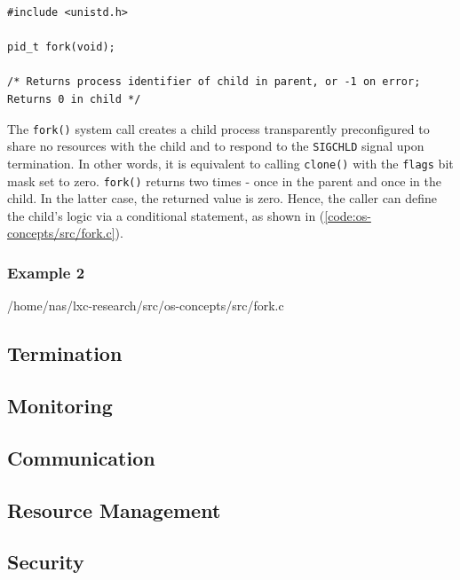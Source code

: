 \begin{lstlisting}[style=syscalls, caption={Fork System Call Wrapper}]
#include <unistd.h>

pid_t fork(void);

/* Returns process identifier of child in parent, or -1 on error; Returns 0 in child */
\end{lstlisting}
The \verb|fork()| system call creates a child process transparently preconfigured to share 
no resources with the child and to respond to the \verb|SIGCHLD| signal upon termination.
In other words, it is equivalent to calling \verb|clone()| with the \verb|flags| bit mask set to 
zero. \verb|fork()| returns two times - once in the parent and once in the child. In the latter 
case, the returned value is zero. Hence, the caller can define the child's logic via a conditional 
statement, as shown in (\ref{code:os-concepts/src/fork.c}).
\subsubsection{Example 2}

{/home/nas/lxc-research/src/os-concepts/src/fork.c}


\subsection{Termination}
\label{ch:fundamentals/processes/termination}
\subsection{Monitoring}
\label{ch:fundamentals/processes/monitoring}
\subsection{Communication}
\label{ch:fundamentals/processes/communication}
\subsection{Resource Management}
\label{ch:fundamentals/processes/resource-management}
\subsection{Security}
\label{ch:fundamentals/processes/security}
